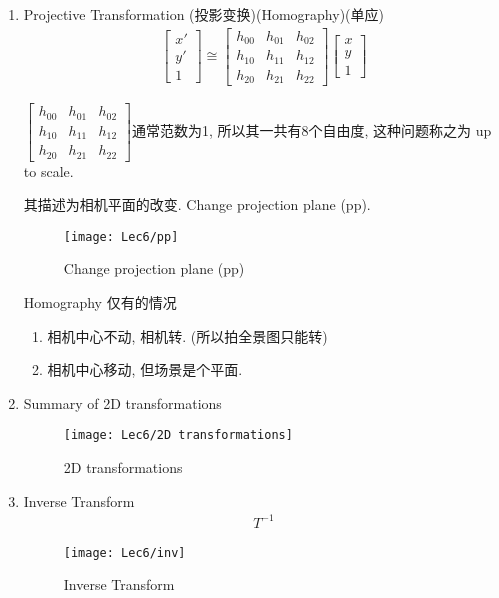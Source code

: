 \begin{enumerate}
\begin{enumerate}
    \end{enumerate}
    \item Projective Transformation (投影变换)(Homography)(单应)
    \begin{align*}
        \begin{bmatrix}
            x'\\y'\\1
        \end{bmatrix}\cong \begin{bmatrix}
            h_{00}&h_{01}&h_{02}\\
            h_{10}&h_{11}&h_{12}\\
            h_{20}&h_{21}&h_{22}
        \end{bmatrix}\begin{bmatrix}
            x\\y\\1
        \end{bmatrix}
    \end{align*}

    $\begin{bmatrix}
        h_{00}&h_{01}&h_{02}\\
        h_{10}&h_{11}&h_{12}\\
        h_{20}&h_{21}&h_{22}
    \end{bmatrix}$通常范数为1, 所以其一共有8个自由度, 这种问题称之为 up to scale.
    
    其描述为相机平面的改变. Change projection plane (pp).
    \begin{figure}[H]
        \centering
        \texttt{[image: Lec6/pp]}
        \caption{Change projection plane (pp)}
    \end{figure}

    Homography 仅有的情况
    \begin{enumerate}
        \item 相机中心不动, 相机转. (所以拍全景图只能转)
        \item 相机中心移动, 但场景是个平面. 
    \end{enumerate}

    \item Summary of 2D transformations

    \begin{figure}[H]
        \centering
        \texttt{[image: Lec6/2D transformations]}
        \caption{2D transformations}
    \end{figure}
    \item Inverse Transform
    \begin{align*}
        T^{-1}
    \end{align*}
    \begin{figure}[H]
        \centering
        \texttt{[image: Lec6/inv]}
        \caption{Inverse Transform}
    \end{figure}
 \end{enumerate}

